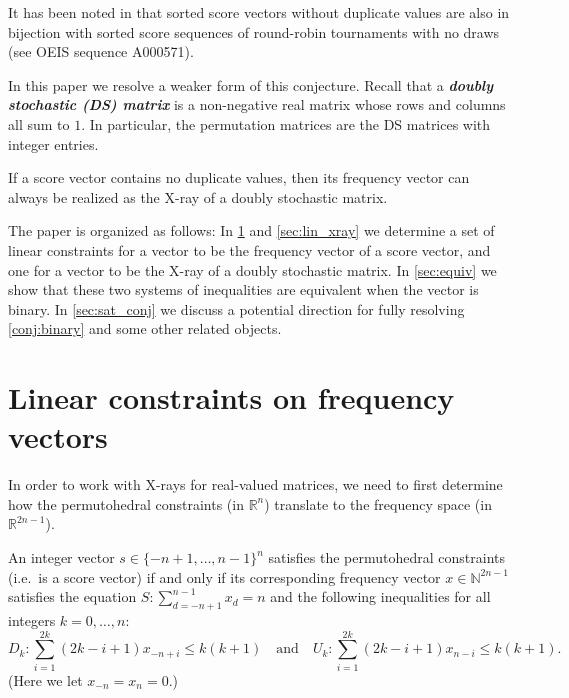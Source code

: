 \documentclass[letterpaper,reqno,11pt]{amsart}
\newcommand{\bfemph}[1]{\textbf{\emph{#1}}}
\begin{document}
\begin{remark}
    It has been noted in \cite{BMPS2005} that sorted score vectors without duplicate values are also in bijection with sorted score sequences of round-robin tournaments with no draws (see OEIS sequence A000571).
\end{remark}

In this paper we resolve a weaker form of this conjecture. Recall that a \bfemph{doubly stochastic (DS) matrix} is a non-negative real matrix whose rows and columns all sum to $1$. In particular, the permutation matrices are the DS matrices with integer entries.

\begin{theorem}\label{thm:main}
    If a score vector contains no duplicate values, then its frequency vector can always be realized as the X-ray of a doubly stochastic matrix.
\end{theorem}

The paper is organized as follows: In \cref{sec:lin_freq} and \cref{sec:lin_xray} we determine a set of linear constraints for a vector to be the frequency vector of a score vector, and one for a vector to be the X-ray of a doubly stochastic matrix. In \cref{sec:equiv} we show that these two systems of inequalities are equivalent when the vector is binary. In \cref{sec:sat_conj} we discuss a potential direction for fully resolving \cref{conj:binary} and some other related objects.

\section{Linear constraints on frequency vectors} \label{sec:lin_freq}

In order to work with X-rays for real-valued matrices, we need to first determine how the permutohedral constraints (in $\mathbb{R}^n$) translate to the frequency space (in $\mathbb{R}^{2n-1}$). 

\begin{proposition}\label{prop:x-conditions}
    An integer vector $s\in \{-n+1, \dots, n-1\}^n$ satisfies the permutohedral constraints (i.e.\ is a score vector) if and only if its corresponding frequency vector $x\in \mathbb{N}^{2n-1}$ satisfies the equation $S: \sum_{d=-n+1}^{n-1} x_d = n$ and the following inequalities for all integers $k = 0, \dots, n$: 
        \[D_k: \sum_{i=1}^{2k} (2k-i+1) x_{-n+i} \leq k(k+1) \quad \text{and} \quad U_k: \sum_{i=1}^{2k} (2k-i+1) x_{n-i}\leq k(k+1).\]
    (Here we let $x_{-n} = x_n = 0$.)
\end{proposition}
\end{document}
